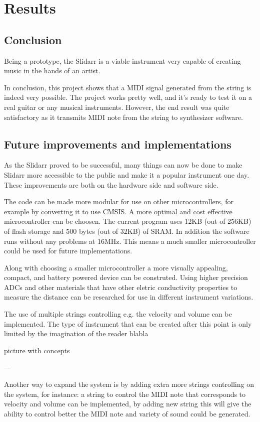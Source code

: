 \documentclass{article}
\begin{document}
\section{Results}

\subsection{Conclusion}
Being a prototype, the Slidarr is a viable instrument very capable of creating music in the hands of an artist.

In conclusion, this project shows that a MIDI signal generated from the string is indeed very possible.
The project works pretty well, and it's ready to test it on a real guitar or any musical instruments. However, the end result was quite satisfactory as it transmits MIDI note from the string to synthesizer software.

\subsection{Future improvements and implementations}
As the Slidarr proved to be successful, many things can now be done to make Slidarr more accessible to the public and make it a popular instrument one day. These improvements are both on the hardware side and software side.

The code can be made more modular for use on other microcontrollers, for example by converting it to use CMSIS. A more optimal and cost effective microcontroller can be choosen. The current program uses 12KB (out of 256KB) of flash storage and 500 bytes (out of 32KB) of SRAM. In addition the software runs without any problems at 16MHz. This means a much smaller microcontroller could be used for future implementations.

Along with choosing a smaller microcontroller a more visually appealing, compact, and battery powered device can be construted. Using higher precision ADCs and other materials that have other eletric conductivity properties to measure the distance can be researched for use in different instrument variations.

The use of multiple strings controlling e.g. the velocity and volume can be implemented. The type of instrument that can be created after this point is only limited by the imagination of the reader blabla

picture with concepts

---

Another way to expand the system is by adding extra more strings controlling on the system, for instance: a string to control the MIDI note that corresponds to velocity and volume can be implemented,  by adding new string this will give the ability to control better the MIDI note and variety of sound could be generated. 
\end{document}
